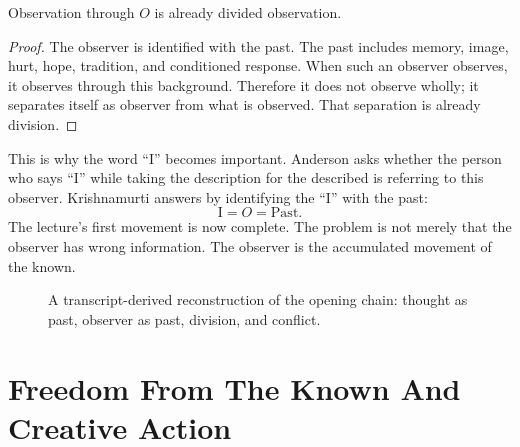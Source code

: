 \begin{proposition}
Observation through \(O\) is already divided observation.
\end{proposition}

\begin{proof}
The observer is identified with the past. The past includes memory, image, hurt, hope, tradition, and conditioned response. When such an observer observes, it observes through this background. Therefore it does not observe wholly; it separates itself as observer from what is observed. That separation is already division.
\end{proof}

This is why the word ``I'' becomes important. Anderson asks whether the person who says ``I'' while taking the description for the described is referring to this observer. Krishnamurti answers by identifying the ``I'' with the past:
\begin{equation}
\mathrm{I}=O=\mathrm{Past}.
\end{equation}
The lecture's first movement is now complete. The problem is not merely that the observer has wrong information. The observer is the accumulated movement of the known.

\begin{figure}
\centering
{}
\caption{A transcript-derived reconstruction of the opening chain: thought as past, observer as past, division, and conflict.}
\end{figure}

\section{Freedom From The Known And Creative Action}

